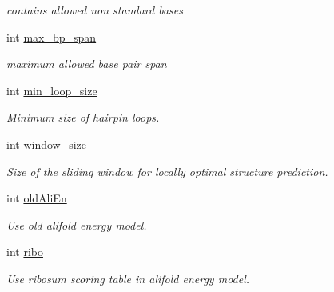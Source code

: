 \begin{DoxyCompactItemize}
\begin{DoxyCompactList}\small\item\em contains allowed non standard bases \end{DoxyCompactList}\item 
\mbox{\label{group__model__details_a659e5fcc6e8c9f1a68e7de6548eef3b0}} 
int \hyperlink{group__model__details_a659e5fcc6e8c9f1a68e7de6548eef3b0}{max\+\_\+bp\+\_\+span}
\begin{DoxyCompactList}\small\item\em maximum allowed base pair span \end{DoxyCompactList}\item 
int \hyperlink{group__model__details_a9ed7ba42fcc46915c5c0c524f3d255f5}{min\+\_\+loop\+\_\+size}
\begin{DoxyCompactList}\small\item\em Minimum size of hairpin loops. \end{DoxyCompactList}\item 
\mbox{\label{group__model__details_abea42f9229f8d8d6bcbedef316315bfc}} 
int \hyperlink{group__model__details_abea42f9229f8d8d6bcbedef316315bfc}{window\+\_\+size}
\begin{DoxyCompactList}\small\item\em Size of the sliding window for locally optimal structure prediction. \end{DoxyCompactList}\item 
\mbox{\label{group__model__details_ab53aec4503130877973c6111ae6f0f76}} 
int \hyperlink{group__model__details_ab53aec4503130877973c6111ae6f0f76}{old\+Ali\+En}
\begin{DoxyCompactList}\small\item\em Use old alifold energy model. \end{DoxyCompactList}\item 
\mbox{\label{group__model__details_a3df2ae4bd9c133ef8ab92a53b1d035ec}} 
int \hyperlink{group__model__details_a3df2ae4bd9c133ef8ab92a53b1d035ec}{ribo}
\begin{DoxyCompactList}\small\item\em Use ribosum scoring table in alifold energy model. \end{DoxyCompactList}\item 

\end{DoxyCompactItemize}
